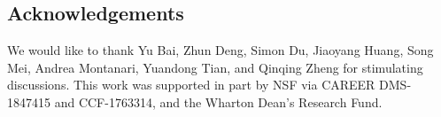 \documentclass[11pt]{article}
\begin{document}






\subsection*{Acknowledgements}
We would like to thank Yu Bai, Zhun Deng, Simon Du, Jiaoyang Huang, Song Mei, Andrea Montanari, Yuandong Tian, and Qinqing Zheng for stimulating discussions. This work was supported in part by NSF via CAREER DMS-1847415 and CCF-1763314, and the Wharton Dean's Research Fund. 





\clearpage
\appendix

%
\end{document}
